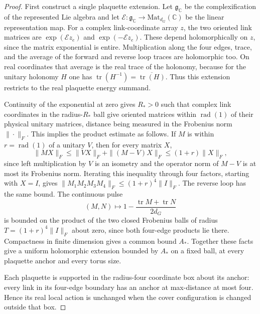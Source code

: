 \begin{proof}
First construct a single plaquette extension. Let $\mathfrak g_\mathbb C$ be
the complexification of the represented Lie algebra and let
$\mathcal E:\mathfrak g_\mathbb C\to\mathrm{Mat}_{d_G}(\mathbb C)$ be the
linear representation map. For a complex link-coordinate array $z$, the two
oriented link matrices are $\exp(\mathcal E z_e)$ and
$\exp(-\mathcal E z_e)$. These depend holomorphically on $z$, since the
matrix exponential is entire. Multiplication along the four edges, trace,
and the average of the forward and reverse loop traces are holomorphic too.
On real coordinates that average is the real trace of the holonomy, because
for the unitary holonomy $H$ one has
$\operatorname{tr}(H^{-1})=\overline{\operatorname{tr}(H)}$. Thus this
extension restricts to the real plaquette energy summand.

Continuity of the exponential at zero gives $R_*>0$ such that complex link
coordinates in the radius-$R_*$ ball give oriented matrices within
$\operatorname{rad}(1)$ of their physical unitary matrices, distance being
measured in the Frobenius norm $\|\cdot\|_F$. This implies the product
estimate as follows. If $M$
is within $r=\operatorname{rad}(1)$ of a unitary $V$, then for every matrix
$X$,
\[
 \|MX\|_F\leq\|VX\|_F+\|(M-V)X\|_F
       \leq(1+r)\|X\|_F,
\]
since left multiplication by $V$ is an isometry and the operator norm of
$M-V$ is at most its Frobenius norm. Iterating this inequality through four
factors, starting with $X=I$, gives
$\|M_1M_2M_3M_4\|_F\leq(1+r)^4\|I\|_F$. The reverse loop has the same
bound. The continuous pulse
\[
 (M,N)\longmapsto1-\frac{\operatorname{tr}M+\operatorname{tr}N}{2d_G}
\]
is bounded on the product of the two closed Frobenius balls of radius
$T=(1+r)^4\|I\|_F$ about zero, since both four-edge products lie there.
Compactness in finite dimension gives a common bound $A_*$.
Together these facts give a uniform holomorphic extension bounded by $A_*$
on a fixed ball, at every plaquette anchor and every torus size.

Each plaquette is supported in the radius-four coordinate box about its
anchor: every link in its four-edge boundary has an anchor at max-distance at
most four. Hence its real local action is unchanged when the cover
configuration is changed outside that box.


\end{proof}
